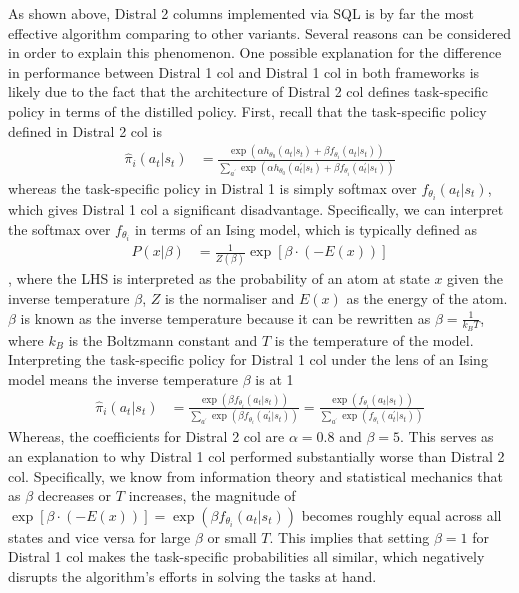 \documentclass[12pt]{report}
\begin{document}
As shown above, Distral 2 columns implemented via SQL is by far the most effective algorithm comparing to other variants. Several reasons can be considered in order to explain this phenomenon. One possible explanation for the difference in performance between Distral 1 col and Distral 1 col in both frameworks is likely due to the fact that the architecture of Distral 2 col defines task-specific policy in terms of the distilled policy. First, recall that the task-specific policy defined in Distral 2 col is 
\begin{align}
\hat{\pi}_i(a_t|s_t) &= \frac{\exp(\alpha h_{\theta_0}(a_t| s_t) + \beta f_{\theta_i}(a_t | s_t))}{\sum_{a^\prime}\exp(\alpha h_{\theta_0}(a^\prime_t | s_t) + \beta f_{\theta_i}(a^\prime _t | s_t))} \nonumber
\end{align}
whereas the task-specific policy in Distral 1 is simply softmax over $f_{\theta_i}(a_t | s_t)$, which gives Distral 1 col a significant disadvantage. Specifically, we can interpret the softmax over $f_{\theta_i}$ in terms of an Ising model, which is typically defined as
\begin{align}
P(x|\beta) &= \frac{1}{Z(\beta)}\exp[\beta \cdot (-E(x))] \label{eq:gibbs-dist}
\end{align}
, where the LHS is interpreted as the probability of an atom at state $x$ given the inverse temperature $\beta$, $Z$ is the normaliser and $E(x)$ as the energy of the atom. $\beta$ is known as the inverse temperature because it can be rewritten as $\beta = \frac{1}{k_B T}$, where $k_B$ is the Boltzmann constant and $T$ is the temperature of the model.\\

Interpreting the task-specific policy for Distral 1 col under the lens of an Ising model means the inverse temperature $\beta$ is at 1
\begin{align}
\hat{\pi}_i(a_t|s_t) &= \frac{\exp(\beta f_{\theta_i}(a_t | s_t))}{\sum_{a^\prime}\exp(\beta f_{\theta_i}(a^\prime _t | s_t))}
=\frac{\exp(f_{\theta_i}(a_t | s_t))}{\sum_{a^\prime}\exp(f_{\theta_i}(a^\prime _t | s_t))} \nonumber
\end{align}
Whereas, the coefficients for Distral 2 col are $\alpha = 0.8$ and $\beta = 5$. This serves as an explanation to why Distral 1 col performed substantially worse than Distral 2 col. Specifically, we know from information theory and statistical mechanics \cite{mackay2003information} that as $\beta$ decreases or $T$ increases, the magnitude of $\exp[\beta \cdot (-E(x))]=\exp(\beta f_{\theta_i}(a_t | s_t))$ becomes roughly equal across all states and vice versa for large $\beta$ or small $T$. This implies that setting $\beta = 1$ for Distral 1 col makes the task-specific probabilities all similar, which negatively disrupts the algorithm's efforts in solving the tasks at hand.\\
\end{document}
